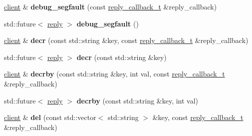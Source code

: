 \begin{DoxyCompactItemize}
\mbox{\hyperlink{classcpp__redis_1_1client}{client}} \& {\bfseries debug\+\_\+segfault} (const \mbox{\hyperlink{classcpp__redis_1_1client_af7a65eb21aa25230bfbb0b0203c4fc04}{reply\+\_\+callback\+\_\+t}} \&reply\+\_\+callback)
\item 
\mbox{\label{classcpp__redis_1_1client_a764786e7003c538a6cf0a5d6b44d66dd}} 
std\+::future$<$ \mbox{\hyperlink{classcpp__redis_1_1reply}{reply}} $>$ {\bfseries debug\+\_\+segfault} ()
\item 
\mbox{\label{classcpp__redis_1_1client_a8e09d5753d9f9ba00b1d5e8aed306189}} 
\mbox{\hyperlink{classcpp__redis_1_1client}{client}} \& {\bfseries decr} (const std\+::string \&key, const \mbox{\hyperlink{classcpp__redis_1_1client_af7a65eb21aa25230bfbb0b0203c4fc04}{reply\+\_\+callback\+\_\+t}} \&reply\+\_\+callback)
\item 
\mbox{\label{classcpp__redis_1_1client_ac80abd9a238a7613294d4444bbc92907}} 
std\+::future$<$ \mbox{\hyperlink{classcpp__redis_1_1reply}{reply}} $>$ {\bfseries decr} (const std\+::string \&key)
\item 
\mbox{\label{classcpp__redis_1_1client_aaa45a662abeaa66f5a8c985cd27957c8}} 
\mbox{\hyperlink{classcpp__redis_1_1client}{client}} \& {\bfseries decrby} (const std\+::string \&key, int val, const \mbox{\hyperlink{classcpp__redis_1_1client_af7a65eb21aa25230bfbb0b0203c4fc04}{reply\+\_\+callback\+\_\+t}} \&reply\+\_\+callback)
\item 
\mbox{\label{classcpp__redis_1_1client_ac4fe81368d7f9cc305811d8346e60881}} 
std\+::future$<$ \mbox{\hyperlink{classcpp__redis_1_1reply}{reply}} $>$ {\bfseries decrby} (const std\+::string \&key, int val)
\item 
\mbox{\label{classcpp__redis_1_1client_a29a5307b20d9ffe951e2ff302797a296}} 
\mbox{\hyperlink{classcpp__redis_1_1client}{client}} \& {\bfseries del} (const std\+::vector$<$ std\+::string $>$ \&key, const \mbox{\hyperlink{classcpp__redis_1_1client_af7a65eb21aa25230bfbb0b0203c4fc04}{reply\+\_\+callback\+\_\+t}} \&reply\+\_\+callback)
\item 
\mbox{\label{classcpp__redis_1_1client_a99c090de7e23accfaf3b93f4b025d2e9}} 

\end{DoxyCompactItemize}
